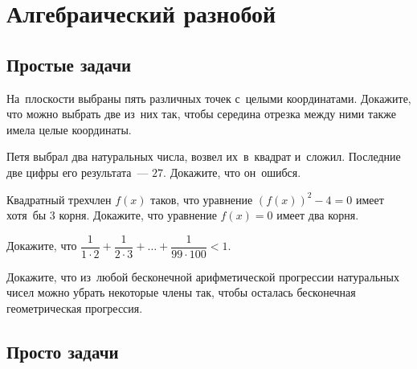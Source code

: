 
\section*{Алгебраический разнобой}





\subsection*{Простые задачи}

\begin{problems}

\item
На~плоскости выбраны пять различных точек с~целыми координатами.
Докажите, что можно выбрать две из~них так, чтобы середина отрезка между ними
также имела целые координаты.

\item
Петя выбрал два натуральных числа, возвел их~в~квадрат и~сложил.
Последние две цифры его результата~--- $27$.
Докажите, что он~ошибся.

\item
Квадратный трехчлен $f(x)$ таков, что уравнение $(f(x))^2 - 4 = 0$ имеет
хотя~бы $3$ корня.
Докажите, что уравнение $f(x) = 0$ имеет два корня.

\item
Докажите, что
\(
    \dfrac{1}{1 \cdot 2}
    +
    \dfrac{1}{2 \cdot 3}
    + \ldots +
    \dfrac{1}{99 \cdot 100}
<
    1
\).

\item
Докажите, что из~любой бесконечной арифметической прогрессии натуральных чисел
можно убрать некоторые члены так, чтобы осталась бесконечная геометрическая
прогрессия.

\end{problems}


\subsection*{Просто задачи}

